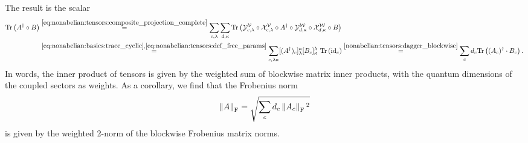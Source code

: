 %
The result is the scalar
\begin{align}
    \label{eq:nonabelian:tensors:inner_product}
    \begin{split}
    \mathrm{Tr}\left( {A^\dagger \circ B} \right)
    &\overset{\eqref{eq:nonabelian:tensors:composite_projection_complete}}{=}
    \sum_{c,\lambda} \sum_{d,\kappa} \mathrm{Tr}\left( {
        \mathcal{Y}^\mathcal{V}_{c,\lambda} \circ \mathcal{X}^\mathcal{V}_{c,\lambda}
        \circ A^\dagger \circ \mathcal{Y}^\mathcal{W}_{d,\kappa}
        \circ \mathcal{X}^\mathcal{W}_{d,\kappa} \circ B
    } \right)
    \\
    &\overset{
        \eqref{eq:nonabelian:basics:trace_cyclic}, \eqref{eq:nonabelian:tensors:def_free_params}
    }{=}
    \sum_{c,\lambda\kappa} [(A^\dagger)_c]^\kappa_\lambda [B_c]^\lambda_\kappa ~ \mathrm{Tr}\left( {\mathrm{id}_{c}} \right)
    \overset{\eqref{nonabelian:tensors:dagger_blockwise}}{=}
    \sum_c d_c \mathrm{Tr}\left( {(A_c)^\dagger \cdot B_c} \right)
    .
    \end{split}
\end{align}
In words, the inner product of tensors is given by the weighted sum of blockwise matrix inner products, with the quantum dimensions of the coupled sectors as weights.
%
As a corollary, we find that the Frobenius norm
\begin{equation}
    \label{eq:nonabelian:tensors:norm}
    \Fnorm{A} = \sqrt{\sum_c d_c \Fnorm{A_c}^2}
\end{equation}
is given by the weighted 2-norm of the blockwise Frobenius matrix norms.

